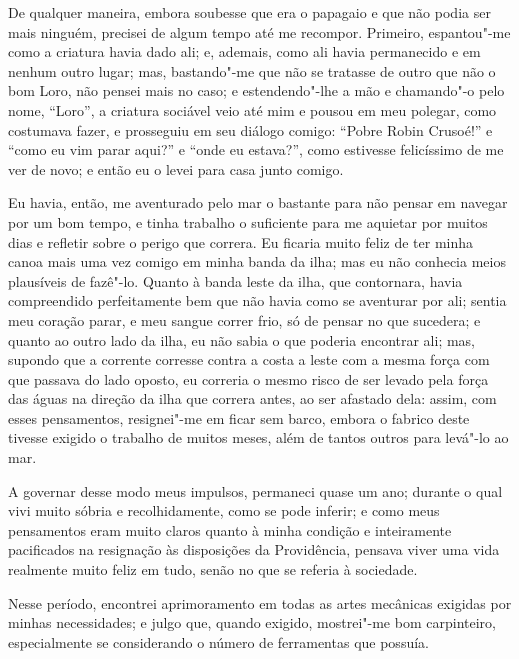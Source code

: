 De qualquer maneira, embora soubesse que era o papagaio e que não podia
ser mais ninguém, precisei de algum tempo até me recompor. Primeiro,
espantou"-me como a criatura havia dado ali; e, ademais, como ali havia
permanecido e em nenhum outro lugar; mas, bastando"-me que não se
tratasse de outro que não o bom Loro, não pensei mais no caso; e
estendendo"-lhe a mão e chamando"-o pelo nome, ``Loro'', a criatura
sociável veio até mim e pousou em meu polegar, como costumava fazer, e
prosseguiu em seu diálogo comigo: ``Pobre Robin Crusoé!'' e ``como eu
vim parar aqui?'' e ``onde eu estava?'', como estivesse felicíssimo de
me ver de novo; e então eu o levei para casa junto comigo.

Eu havia, então, me aventurado pelo mar o bastante para não pensar em
navegar por um bom tempo, e tinha trabalho o suficiente para me aquietar
por muitos dias e refletir sobre o perigo que correra. Eu ficaria muito
feliz de ter minha canoa mais uma vez comigo em minha banda da ilha; mas
eu não conhecia meios plausíveis de fazê"-lo. Quanto à banda leste da
ilha, que contornara, havia compreendido perfeitamente bem que não havia
como se aventurar por ali; sentia meu coração parar, e meu sangue correr
frio, só de pensar no que sucedera; e quanto ao outro lado da ilha, eu
não sabia o que poderia encontrar ali; mas, supondo que a corrente
corresse contra a costa a leste com a mesma força com que passava do
lado oposto, eu correria o mesmo risco de ser levado pela força das
águas na direção da ilha que correra antes, ao ser afastado dela: assim,
com esses pensamentos, resignei"-me em ficar sem barco, embora o fabrico
deste tivesse exigido o trabalho de muitos meses, além de tantos outros
para levá"-lo ao mar.

A governar desse modo meus impulsos, permaneci quase um ano; durante o
qual vivi muito sóbria e recolhidamente, como se pode inferir; e como
meus pensamentos eram muito claros quanto à minha condição e
inteiramente pacificados na resignação às disposições da Providência,
pensava viver uma vida realmente muito feliz em tudo, senão no que se
referia à sociedade.

Nesse período, encontrei aprimoramento em todas as artes mecânicas
exigidas por minhas necessidades; e julgo que, quando exigido,
mostrei"-me bom carpinteiro, especialmente se considerando o número de
ferramentas que possuía.

